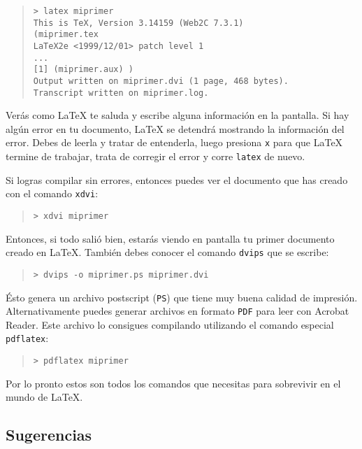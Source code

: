 \begin{quote}
\begin{verbatim}
> latex miprimer
This is TeX, Version 3.14159 (Web2C 7.3.1)
(miprimer.tex
LaTeX2e <1999/12/01> patch level 1
...
[1] (miprimer.aux) )
Output written on miprimer.dvi (1 page, 468 bytes).
Transcript written on miprimer.log.
\end{verbatim}
\end{quote}

Ver\'as como \LaTeX{} te saluda y escribe alguna informaci\'on en la pantalla.
Si hay alg\'un error en tu documento, \LaTeX{} se detendr\'a mostrando la
informaci\'on del error. Debes de leerla y tratar de entenderla, luego
presiona \texttt{x} para que \LaTeX{} termine de trabajar, trata de corregir
el error y corre \texttt{latex} de nuevo.

Si logras compilar sin errores, entonces puedes ver el documento que has creado con el comando 
\texttt{xdvi}:

\begin{quote}
\begin{verbatim}
> xdvi miprimer
\end{verbatim}
\end{quote}

Entonces, si todo sali\'o bien, estar\'as viendo en pantalla tu primer
documento creado en \LaTeX{}. Tambi\'en debes conocer el comando \texttt{dvips} que se escribe:

\begin{quote}
\begin{verbatim}
> dvips -o miprimer.ps miprimer.dvi
\end{verbatim}
\end{quote}

\'Esto genera un archivo postscript (\texttt{PS}) que tiene muy buena calidad de
impresi\'on. Alternativamente puedes generar archivos en formato \texttt{PDF} para
leer con Acrobat Reader. Este archivo lo consigues compilando utilizando el comando
especial \texttt{pdflatex}:

\begin{quote}
\begin{verbatim}
> pdflatex miprimer
\end{verbatim}
\end{quote}

Por lo pronto estos son todos los comandos que necesitas para sobrevivir en el mundo de \LaTeX{}.


\subsection{Sugerencias}\label{sugerencias}

